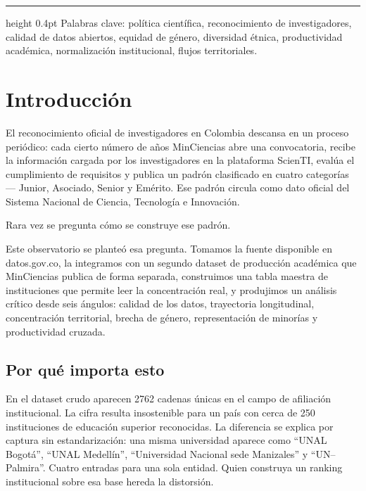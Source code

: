 \documentclass[11pt,a4paper,oneside]{article}
\begin{document}
\bigskip
\hrule height 0.4pt
\vspace{0.3em}
\noindent\footnotesize\color{rule} Palabras clave: política científica, reconocimiento de investigadores, calidad de datos abiertos, equidad de género, diversidad étnica, productividad académica, normalización institucional, flujos territoriales.

\newpage

\hypersetup{linkcolor=black}
\renewcommand{\contentsname}{\color{usta}\Large Tabla de contenidos}
\tableofcontents
\hypersetup{linkcolor=usta}
\newpage

\section{Introducción}\label{sec:intro}

El reconocimiento oficial de investigadores en Colombia descansa en un proceso periódico: cada cierto número de años MinCiencias abre una convocatoria, recibe la información cargada por los investigadores en la plataforma ScienTI, evalúa el cumplimiento de requisitos y publica un padrón clasificado en cuatro categorías --- Junior, Asociado, Senior y Emérito. Ese padrón circula como dato oficial del Sistema Nacional de Ciencia, Tecnología e Innovación.

Rara vez se pregunta cómo se construye ese padrón.

Este observatorio se planteó esa pregunta. Tomamos la fuente disponible en datos.gov.co, la integramos con un segundo dataset de producción académica que MinCiencias publica de forma separada, construimos una tabla maestra de instituciones que permite leer la concentración real, y produjimos un análisis crítico desde seis ángulos: calidad de los datos, trayectoria longitudinal, concentración territorial, brecha de género, representación de minorías y productividad cruzada.

\subsection{Por qué importa esto}

En el dataset crudo aparecen \num{2762} cadenas únicas en el campo de afiliación institucional. La cifra resulta insostenible para un país con cerca de 250 instituciones de educación superior reconocidas. La diferencia se explica por captura sin estandarización: una misma universidad aparece como ``UNAL Bogotá'', ``UNAL Medellín'', ``Universidad Nacional sede Manizales'' y ``UN--Palmira''. Cuatro entradas para una sola entidad. Quien construya un ranking institucional sobre esa base hereda la distorsión.
\end{document}
